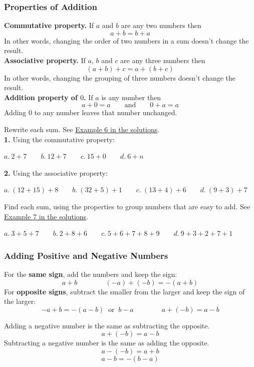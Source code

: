 \documentclass[letter]{article}
\newenvironment{keybox}
  {\begin{lrbox}{\keyboxsave}\begin{minipage}{\dimexpr\linewidth-2\fboxsep-2\fboxrule\relax}}
  {\end{minipage}\end{lrbox}\par\noindent\fbox{\usebox{\keyboxsave}}\par}
\newcommand{\exbox}[1]{\fbox{\textbf{Example #1}}}
\newcommand{\chp}{}
\newcommand{\seesol}[1]{See \hyperref[sec:\chp ex#1]{Example #1 in the solutions}.}
\begin{document}
\subsubsection*{Properties of Addition}

\begin{keybox}
\textbf{Commutative property.} If $a$ and $b$ are any two numbers then
\[a+b=b+a\]
In other words, changing the order of two numbers in a sum doesn't change the result.\\[6pt]
\textbf{Associative property.} If $a$, $b$ and $c$ are any three numbers then
\[(a+b)+c=a+(b+c)\]
In other words, changing the grouping of three numbers doesn't change the result.\\[6pt]
\textbf{Addition property of $0$.} If $a$ is any number then
\[a+0=a\qquad\text{and}\qquad0+a=a\]
Adding $0$ to any number leaves that number unchanged.
\end{keybox}

\exbox{6} Rewrite each sum. \seesol{6}\\
\textbf{1.} Using the commutative property:
\begin{center}
$a.\ 2+7\qquad b.\ 12+7\qquad c.\ 15+0\qquad d.\ 6+n$
\end{center}
\textbf{2.} Using the associative property:
\begin{center}
$a.\ (12+15)+8\qquad b.\ (32+5)+1\qquad c.\ (13+4)+6\qquad d.\ (9+3)+7$
\end{center}

\exbox{7} Find each sum, using the properties to group numbers that are easy to add. \seesol{7}
\begin{center}
$a.\ 3+5+7\qquad b.\ 2+8+6\qquad c.\ 5+6+7+8+9\qquad d.\ 9+3+2+7+1$
\end{center}

\subsubsection*{Adding Positive and Negative Numbers}

\begin{keybox}
For the \textbf{same sign}, add the numbers and keep the sign:
\[a+b\qquad\qquad(-a)+(-b)=-(a+b)\]
For \textbf{opposite signs}, subtract the smaller from the larger and keep the sign of the larger:
\[-a+b=-(a-b)\ \text{ or }\ b-a\qquad\qquad a+(-b)=a-b\]
\end{keybox}

Adding a negative number is the same as subtracting the opposite.
\[a+(-b)=a-b\]
Subtracting a negative number is the same as adding the opposite.
\[a-(-b)=a+b\]
\[a-b=-(b-a)\]
\end{document}
